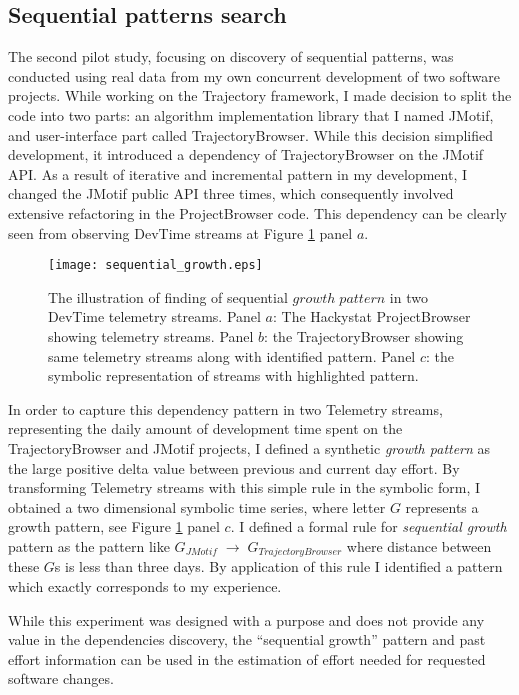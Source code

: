 \subsection{Sequential patterns search}
The second pilot study, focusing on discovery of sequential patterns, was conducted using real data from my own concurrent development of two software projects. While working on the Trajectory framework, I made decision to split the code into two parts: an algorithm implementation library that I named JMotif, and user-interface part called TrajectoryBrowser. While this decision simplified development, it introduced a dependency of TrajectoryBrowser on the JMotif API. As a result of iterative and incremental pattern in my development, I changed the JMotif public API three times, which consequently involved extensive refactoring in the ProjectBrowser code. This dependency can be clearly seen from observing DevTime streams at Figure \ref{fig:sequential_growth} panel $a$. 

\begin{figure}[tbp]
   \centering
   \texttt{[image: sequential\_growth.eps]}
   \caption{The illustration of finding of sequential $growth \; pattern$ in two DevTime telemetry streams. Panel $a$: The Hackystat ProjectBrowser showing telemetry streams. Panel $b$: the TrajectoryBrowser showing same telemetry streams along with identified pattern. Panel $c$: the symbolic representation of streams with highlighted pattern.}
   \label{fig:sequential_growth}
\end{figure}

In order to capture this dependency pattern in two Telemetry streams, representing the daily amount of development time spent on the TrajectoryBrowser and JMotif projects, I defined a synthetic \textit{growth pattern} as the large positive delta value between previous and current day effort. By transforming Telemetry streams with this simple rule in the symbolic form, I obtained a two dimensional symbolic time series, where letter $G$ represents a growth pattern, see Figure \ref{fig:sequential_growth} panel $c$. I defined a formal rule for \textit{sequential growth} pattern as the pattern like $G_{JMotif}\; \rightarrow \; G_{TrajectoryBrowser}$ where distance between these $G$s is less than three days. By application of this rule I identified a pattern which exactly corresponds to my experience. 

While this experiment was designed with a purpose and does not provide any value in the dependencies discovery, the ``sequential growth'' pattern and past effort information can be used in the estimation of effort needed for requested software changes.

